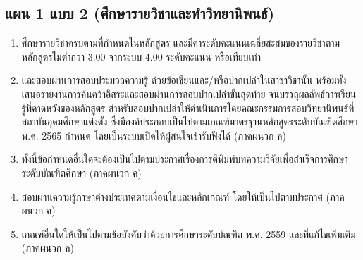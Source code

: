 \subsection{แผน 1 แบบ 2 (ศึกษารายวิชาและทำวิทยานิพนธ์)}
\begin{enumerate}
   	\item ศึกษารายวิชาครบตามที่กำหนดในหลักสูตร และมีค่าระดับคะแนนเฉลี่ยสะสมของรายวิชาตามหลักสูตรไม่ต่ำกว่า $3.00$ จากระบบ $4.00$ ระดับคะแนน หรือเทียบเท่า 
   	\item และสอบผ่านการสอบประมวลความรู้ ด้วยข้อเขียนและ/หรือปากเปล่าในสาขาวิชานั้น พร้อมทั้งเสนอรายงานการค้นคว้าอิสระและสอบผ่านการสอบปากเปล่าขั้นสุดท้าย จนบรรลุผลลัพธ์การเรียนรู้ที่คาดหวังของหลักสูตร สำหรับสอบปากเปล่าให้ดำเนินการโดยคณะกรรมการสอบวิทยานิพนธ์ที่สถาบันอุดมศึกษาแต่งตั้ง ซึ่งมีองค์ประกอบเป็นไปตามเกณฑ์มาตรฐานหลักสูตรระดับบัณฑิตศึกษา พ.ศ. 2565 กำหนด โดยเป็นระบบเปิดให้ผู่้สนใจเข้ารับฟังได้ (ภาคผนวก ค)
   	\item ทั้งนี้ข้อกำหนดอื่นใดจะต้องเป็นไปตามประกาศ\university เรื่องการตีพิมพ์บทความวิจัยเพื่อสำเร็จการศึกษาระดับบัณฑิตศึกษา (ภาคผนวก ค)   	
   \item สอบผ่านความรู้ภาษาต่างประเทศตามเงื่อนไขและหลักเกณฑ์ โดยให้เป็นไปตามประกาศ\university  \,\,(ภาคผนวก ค)
   	\item เกณฑ์อื่นใดให้เป็นไปตามข้อบังคับ\university ว่าด้วยการศึกษาระดับบัณฑิต พ.ศ. 2559 และที่แก้ไขเพิ่มเติม (ภาคผนวก ค)   
   	 \end{enumerate}













